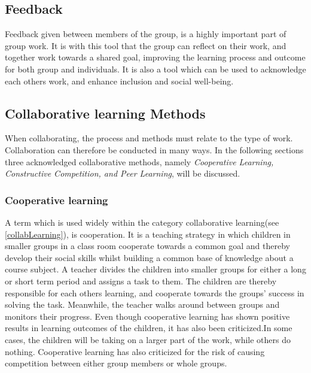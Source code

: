 \subsection{Feedback}
Feedback given between members of the group, is a highly important part of group work\cite{laeringIPraksis}\cite{ProjektarbejdesKompleksitet}. It is with this tool that the group can reflect on their work, and together work towards a shared goal, improving the learning process and outcome for both group and individuals\cite{laeringIPraksis}\cite{ProjektarbejdesKompleksitet}. It is also a tool which can be used to acknowledge each others work, and enhance inclusion and social well-being\cite{laeringIPraksis}\cite{ProjektarbejdesKompleksitet}. 


\subsection{Collaborative learning Methods} 
When collaborating, the process and methods must relate to the type of work. Collaboration can therefore be conducted in many ways. In the following sections three acknowledged collaborative methods, namely \textit{Cooperative Learning, Constructive Competition, and Peer Learning}, will be discussed.  

\subsubsection{Cooperative learning}
A term which is used widely within the category collaborative learning(see \autoref{collabLearning}), is cooperation\cite{collaborationCooperation}. It is a teaching strategy in which children in smaller groups in a class room cooperate towards a common goal and thereby develop their social skills whilst building a common base of knowledge about a course subject\cite{collaborativeLearningTeachers}\cite[p.~15]{peerLearning}\cite{collaborationCompetition}\cite{cooperativeLearningPractice}. A teacher divides the children into smaller groups for either a long or short term period and assigns a task to them. The children are thereby responsible for each others learning, and cooperate towards the groups' success in solving the task. Meanwhile, the teacher walks around between groups and monitors their progress\cite{cooperativeLearningPractice}. Even though cooperative learning has shown positive results in learning outcomes of the children, it has also been criticized.In some cases, the children will be taking on a larger part of the work, while others do nothing. Cooperative learning has also criticized for the risk of causing competition between either group members or whole groups\cite{collaborationCooperation}.

